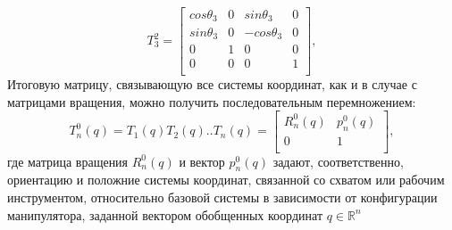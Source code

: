 \begin{equation*}\label{eq:model}
T_3^2 = 
     \begin{bmatrix}
    cos{\theta_3} & 0 &  sin{\theta_3} & 0 \\
    sin{\theta_3} & 0 &  -cos{\theta_3} & 0 \\
    0 & 1 & 0 & 0\\
    0 & 0 & 0 & 1\\
    \end{bmatrix}
    ,
\end{equation*} 
\hspace*{\parindent}Итоговую матрицу, связывающую все системы координат, как и в случае с матрицами вращения, можно получить последовательным перемножением:\\

\begin{equation*}\label{eq:model}
T_n^0(q) = T_1(q)T_2(q)..T_n(q) = 
     \begin{bmatrix}
    R_n^0(q) & p_n^0(q)\\
    0 & 1\\
    \end{bmatrix}
    ,
\end{equation*} 
\hspace*{\parindent}где матрица вращения  $R_n^0(q)$ и вектор $p_n^0(q)$ задают, соответственно, ориентацию и положние системы координат, связанной со схватом или рабочим инструментом, относительно базовой системы в зависимости от конфигурации манипулятора, заданной вектором обобщенных координат $q \in \mathbb {R}^n$